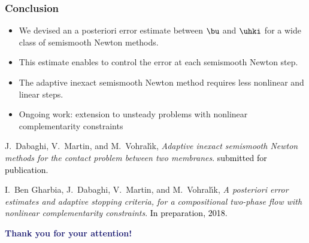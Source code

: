 \documentclass{beamer}
\begin{document}
\begin{frame}
\frametitle{Conclusion}
\begin{itemize}
\item
We devised an a posteriori error estimate between $\bu$ and $\uhki$ for a wide class of semismooth Newton methods.
\vspace{0.5 cm}

\item 
This estimate enables to control the error at each semismooth Newton step.
\vspace{0.5 cm}
\item
The adaptive inexact semismooth Newton method requires less nonlinear and linear steps.
\vspace{0.5 cm}
\item
Ongoing work: extension to unsteady problems with nonlinear complementarity constraints
\vspace{0.3 cm}
\end{itemize}
\begin{thebibliography}{10}
\scriptsize{
{\sc J.~Dabaghi, V.~Martin, and M.~Vohral{\'{\i}}k}, {\em Adaptive inexact
  semismooth Newton methods for the contact problem between two membranes}.
\textcolor{black}{submitted for publication.}
}
\end{thebibliography}

\begin{thebibliography}{10}
\scriptsize{
{\sc I.~Ben Gharbia, J.~Dabaghi, V.~Martin, and M.~Vohral{\'{\i}}k}, {\em A posteriori error estimates and adaptive stopping criteria, for a compositional two-phase flow with nonlinear complementarity constraints}.
\textcolor{black}{In preparation, 2018.}
}

\end{thebibliography}

\vspace{1 cm}
\Large
\hspace{1.8 cm}
\textcolor{midnightblue}
{\textbf{
Thank you for your attention!}}
\end{frame}
\end{document}
